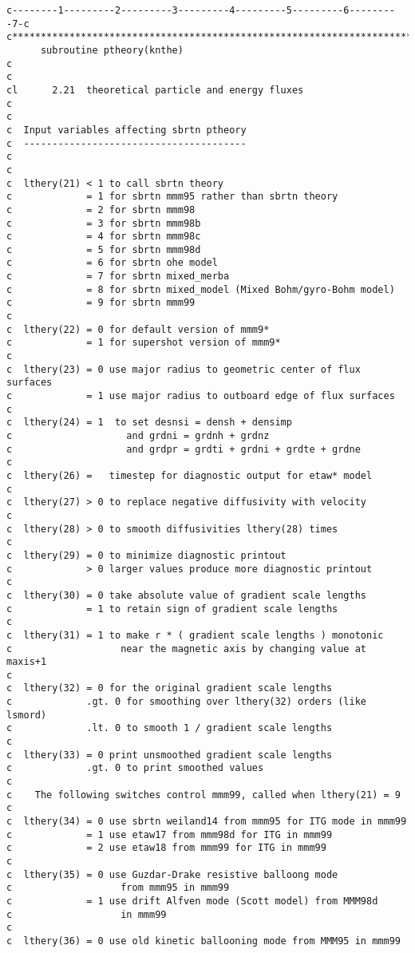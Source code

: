 \begin{verbatim}
c--------1---------2---------3---------4---------5---------6---------7-c
c**********************************************************************c
      subroutine ptheory(knthe)
c
c
cl      2.21  theoretical particle and energy fluxes
c
c
c  Input variables affecting sbrtn ptheory
c  ---------------------------------------
c
c
c  lthery(21) < 1 to call sbrtn theory
c             = 1 for sbrtn mmm95 rather than sbrtn theory
c             = 2 for sbrtn mmm98
c             = 3 for sbrtn mmm98b
c             = 4 for sbrtn mmm98c
c             = 5 for sbrtn mmm98d
c             = 6 for sbrtn ohe model
c             = 7 for sbrtn mixed_merba
c             = 8 for sbrtn mixed_model (Mixed Bohm/gyro-Bohm model)
c             = 9 for sbrtn mmm99
c
c  lthery(22) = 0 for default version of mmm9*
c             = 1 for supershot version of mmm9*
c
c  lthery(23) = 0 use major radius to geometric center of flux surfaces
c             = 1 use major radius to outboard edge of flux surfaces
c
c  lthery(24) = 1  to set desnsi = densh + densimp
c                    and grdni = grdnh + grdnz
c                    and grdpr = grdti + grdni + grdte + grdne
c
c  lthery(26) =   timestep for diagnostic output for etaw* model
c
c  lthery(27) > 0 to replace negative diffusivity with velocity
c
c  lthery(28) > 0 to smooth diffusivities lthery(28) times
c
c  lthery(29) = 0 to minimize diagnostic printout
c             > 0 larger values produce more diagnostic printout
c
c  lthery(30) = 0 take absolute value of gradient scale lengths
c             = 1 to retain sign of gradient scale lengths
c
c  lthery(31) = 1 to make r * ( gradient scale lengths ) monotonic
c                   near the magnetic axis by changing value at maxis+1
c
c  lthery(32) = 0 for the original gradient scale lengths
c             .gt. 0 for smoothing over lthery(32) orders (like lsmord)
c             .lt. 0 to smooth 1 / gradient scale lengths
c
c  lthery(33) = 0 print unsmoothed gradient scale lengths
c             .gt. 0 to print smoothed values
c
c    The following switches control mmm99, called when lthery(21) = 9
c
c  lthery(34) = 0 use sbrtn weiland14 from mmm95 for ITG mode in mmm99
c             = 1 use etaw17 from mmm98d for ITG in mmm99
c             = 2 use etaw18 from mmm99 for ITG in mmm99
c
c  lthery(35) = 0 use Guzdar-Drake resistive balloong mode
c                   from mmm95 in mmm99
c             = 1 use drift Alfven mode (Scott model) from MMM98d
c                   in mmm99
c
c  lthery(36) = 0 use old kinetic ballooning mode from MMM95 in mmm99

\end{verbatim}
